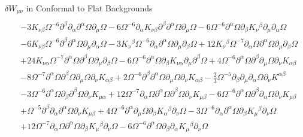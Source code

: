 \documentclass[8pt,aspectratio=1610]{beamer}
\begin{document}
\begin{frame}{$\delta W_{\mu\nu}$ in Conformal to Flat Backgrounds}
{\begin{align}
		\nonumber\\
		&- 3 K_{\nu \beta} \Omega^{-6} \partial^{\beta}\partial_{\alpha}\partial^{\alpha}\Omega \partial_{\mu}\Omega - 6 \Omega^{-6} \partial_{\alpha}K_{\nu \beta} \partial^{\beta}\partial^{\alpha}\Omega \partial_{\mu}\Omega - 6 \Omega^{-6} \partial^{\alpha}\Omega \partial_{\beta}K_{\nu}{}^{\beta} \partial_{\mu}\partial_{\alpha}\Omega 
		\nonumber\\
		&- 6 K_{\nu \beta} \Omega^{-6} \partial^{\beta}\partial^{\alpha}\Omega \partial_{\mu}\partial_{\alpha}\Omega - 3 K_{\nu}{}^{\beta} \Omega^{-6} \partial_{\alpha}\partial^{\alpha}\Omega \partial_{\mu}\partial_{\beta}\Omega + 12 K_{\nu}{}^{\beta} \Omega^{-7} \partial_{\alpha}\Omega \partial^{\alpha}\Omega \partial_{\mu}\partial_{\beta}\Omega 
		\nonumber\\
		&+ 24 K_{\nu \alpha} \Omega^{-7} \partial^{\alpha}\Omega \partial^{\beta}\Omega \partial_{\mu}\partial_{\beta}\Omega - 6 \Omega^{-6} \partial^{\alpha}\Omega \partial_{\beta}K_{\nu \alpha} \partial_{\mu}\partial^{\beta}\Omega + 4 \Omega^{-6} \partial^{\alpha}\Omega \partial^{\beta}\partial_{\mu}\Omega \partial_{\nu}K_{\alpha \beta} 
		\nonumber\\
		&- 8 \Omega^{-7} \partial^{\alpha}\Omega \partial^{\beta}\Omega \partial_{\mu}\Omega \partial_{\nu}K_{\alpha \beta} + 2 \Omega^{-6} \partial^{\beta}\partial^{\alpha}\Omega \partial_{\mu}\Omega \partial_{\nu}K_{\alpha \beta} -  \tfrac{2}{3} \Omega^{-5} \partial_{\beta}\partial_{\mu}\partial_{\alpha}\Omega \partial_{\nu}K^{\alpha \beta} 
		\nonumber\\
		&- 3 \Omega^{-6} \partial^{\alpha}\Omega \partial_{\beta}\partial^{\beta}\Omega \partial_{\nu}K_{\mu \alpha} + 12 \Omega^{-7} \partial_{\alpha}\Omega \partial^{\alpha}\Omega \partial^{\beta}\Omega \partial_{\nu}K_{\mu \beta} - 6 \Omega^{-6} \partial^{\alpha}\Omega \partial^{\beta}\partial_{\alpha}\Omega \partial_{\nu}K_{\mu \beta} 
		\nonumber\\
		&+ \Omega^{-5} \partial^{\beta}\partial_{\alpha}\partial^{\alpha}\Omega \partial_{\nu}K_{\mu \beta} + 4 \Omega^{-6} \partial^{\alpha}\partial_{\mu}\Omega \partial_{\beta}K_{\alpha}{}^{\beta} \partial_{\nu}\Omega - 3 \Omega^{-6} \partial_{\alpha}\partial^{\alpha}\Omega \partial_{\beta}K_{\mu}{}^{\beta} \partial_{\nu}\Omega 
		\nonumber\\
		&+ 12 \Omega^{-7} \partial_{\alpha}\Omega \partial^{\alpha}\Omega \partial_{\beta}K_{\mu}{}^{\beta} \partial_{\nu}\Omega - 6 \Omega^{-6} \partial^{\alpha}\Omega \partial_{\beta}\partial_{\alpha}K_{\mu}{}^{\beta} \partial_{\nu}\Omega 

\end{align}}
\end{frame}
\end{document}
